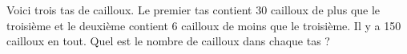 Voici trois tas de cailloux. Le premier tas contient 30 cailloux de plus que le troisième et le deuxième contient 6 cailloux de moins que le troisième. 
Il y a 150 cailloux en tout. Quel est le nombre de cailloux dans chaque tas ?